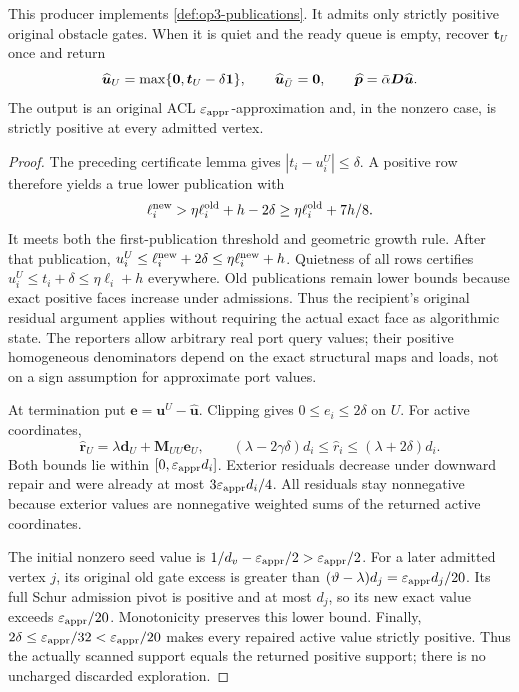 \begin{lemma}
\label{lem:op3-approximate-publications-repair}
This producer implements \cref{def:op3-publications}. It admits only
strictly positive original obstacle gates. When it is quiet and the ready
queue is empty, recover $\bm t_U$ once and return
\begin{equation}
 \widehat{\bm u}_U=\max\{\bm0,\bm t_U-\delta\mathbf{1}\},\qquad
 \widehat{\bm u}_{\bar U}=\bm0,\qquad
 \widehat{\bm p}=\bar\alpha\bm D\widehat{\bm u}.
 \label{eq:op3-coarse-final-repair}
\end{equation}
The output is an original ACL $\varepsilon_{\mathrm{appr}}$-approximation and, in the nonzero
case, is strictly positive at every admitted vertex.
\end{lemma}
\begin{proof}
The preceding certificate lemma gives $|t_i-u_i^U|\leq\delta$. A positive
row therefore yields a true lower publication with
\[
 \ell_i^{\rm new}>\eta\ell_i^{\rm old}+h-2\delta
 \geq\eta\ell_i^{\rm old}+7h/8.
\]
It meets both the first-publication threshold and geometric growth rule.
After that publication, $u_i^U\leq\ell_i^{\rm new}+2\delta
\leq\eta\ell_i^{\rm new}+h$. Quietness of all rows certifies
$u_i^U\leq t_i+\delta\leq\eta\ell_i+h$ everywhere.
Old publications remain lower bounds because exact positive faces increase
under admissions. Thus the recipient's original residual argument applies
without requiring the actual exact face as algorithmic state.
The reporters allow arbitrary real port query values; their positive
homogeneous denominators depend on the exact structural maps and loads,
not on a sign assumption for approximate port values.

At termination put $\bm e=\bm u^U-\widehat{\bm u}$.
Clipping gives $0\leq e_i\leq2\delta$ on $U$. For active coordinates,
\[
 \widehat{\bm r}_U=\lambda\bm d_U+\bm M_{UU}\bm e_U,
 \qquad
 (\lambda-2\gamma\delta)d_i\leq\widehat r_i
       \leq(\lambda+2\delta)d_i.
\]
Both bounds lie within $[0,\varepsilon_{\mathrm{appr}} d_i]$. Exterior residuals decrease
under downward repair and were already at most $3\varepsilon_{\mathrm{appr}} d_i/4$.
All residuals stay nonnegative because exterior values are nonnegative
weighted sums of the returned active coordinates.

The initial nonzero seed value is $1/d_v-\varepsilon_{\mathrm{appr}}/2>\varepsilon_{\mathrm{appr}}/2$.
For a later admitted vertex $j$, its original old gate excess is greater
than $(\vartheta-\lambda)d_j=\varepsilon_{\mathrm{appr}} d_j/20$. Its full Schur admission
pivot is positive and at most $d_j$, so its new exact value exceeds
$\varepsilon_{\mathrm{appr}}/20$. Monotonicity preserves this lower bound. Finally,
$2\delta\leq\varepsilon_{\mathrm{appr}}/32<\varepsilon_{\mathrm{appr}}/20$ makes every repaired active value
strictly positive. Thus the actually scanned support equals the returned
positive support; there is no uncharged discarded exploration.
\end{proof}

